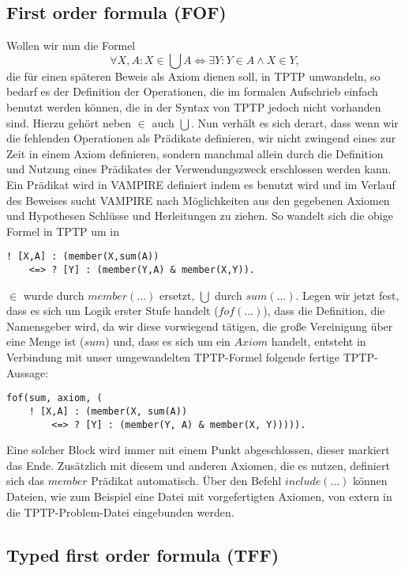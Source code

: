 \documentclass{article}
\begin{document}
\subsection{First order formula (FOF)}
\label{subsec:tptpfof}
Wollen wir nun die Formel 
\[\forall X,A : X \in \bigcup A \Leftrightarrow \exists Y : Y \in A \land X \in Y,\]
die für einen späteren Beweis als Axiom dienen soll, in TPTP umwandeln, 
so bedarf es der Definition der Operationen, die im formalen Aufschrieb einfach benutzt werden können, 
die in der Syntax von TPTP jedoch nicht vorhanden sind.
Hierzu gehört neben $\in$ auch  $\bigcup$. 
Nun verhält es sich derart, dass wenn wir die fehlenden Operationen als Prädikate definieren, 
wir nicht zwingend eines zur Zeit in einem Axiom definieren, sondern manchmal allein durch die Definition und Nutzung eines Prädikates der Verwendungszweck erschlossen werden kann.
Ein Prädikat wird in VAMPIRE definiert indem es benutzt wird und im Verlauf des Beweises sucht VAMPIRE nach Möglichkeiten aus den gegebenen Axiomen und Hypothesen Schlüsse und Herleitungen zu ziehen.
So wandelt sich die obige Formel in TPTP um in 
\begin{lstlisting}[language=tptp]
! [X,A] : (member(X,sum(A))
	<=> ? [Y] : (member(Y,A) & member(X,Y)).
\end{lstlisting}
$\in$ wurde durch $member(\dots)$ ersetzt, $\bigcup$ durch $sum(\dots)$.
Legen wir jetzt fest, dass es sich um Logik erster Stufe handelt ($fof(\dots)$), dass die Definition, die Namensgeber wird, da wir diese vorwiegend tätigen, die große Vereinigung über eine Menge ist ($sum$) und, dass es sich um ein $Axiom$ handelt,
entsteht in Verbindung mit unser umgewandelten TPTP-Formel folgende fertige TPTP-Aussage:
\begin{lstlisting}[language=tptp]
fof(sum, axiom, (	
	! [X,A] : (member(X, sum(A)) 
		<=> ? [Y] : (member(Y, A) & member(X, Y))))).
\end{lstlisting}
Eine solcher Block wird immer mit einem Punkt abgeschlossen, dieser markiert das Ende.
Zusätzlich mit diesem und anderen Axiomen, die es nutzen, definiert sich das $member$ Prädikat automatisch.
Über den Befehl $include(\dots)$ können Dateien, wie zum Beispiel eine Datei mit vorgefertigten Axiomen, von extern in die TPTP-Problem-Datei eingebunden werden.

\subsection{Typed first order formula (TFF)}
\label{subsec:tptptff}
\end{document}

